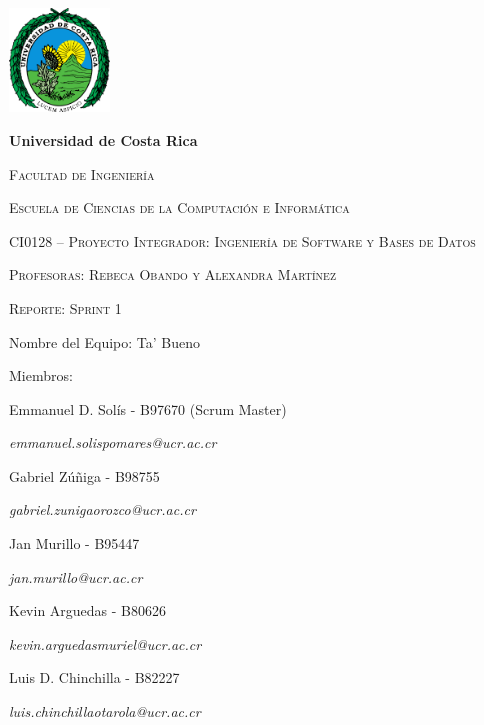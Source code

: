 \documentclass{article}
\begin{document}
\begin{titlepage}
\centering
{\includegraphics[width=0.2\textwidth]{logoUCR.png}\par}
\vspace{1cm}
{\bfseries\LARGE Universidad de Costa Rica \par}
\vspace{1cm}
{\scshape\Large Facultad de Ingenier\'ia \par}
{\scshape\Large Escuela de Ciencias de la Computaci\'on e Inform\'atica \par}
\vspace{1cm}
{\scshape\Large CI0128 – Proyecto Integrador: Ingeniería de Software y Bases de Datos \par}
{\scshape\Large Profesoras: Rebeca Obando y Alexandra Martínez \par}
\vspace{1cm}
{\scshape\Huge Reporte: Sprint 1 \par}
\vspace{1cm}
{\Large Nombre del Equipo: Ta' Bueno \par}
\vspace{0.5cm}
{\Large Miembros: \par}
{\Large Emmanuel D. Sol\'is - B97670 (Scrum Master)\par}
{\Large \textit{\color{blue}emmanuel.solispomares@ucr.ac.cr} \par}
{\Large Gabriel Zúñiga - B98755\par}
{\Large \textit{\color{blue}gabriel.zunigaorozco@ucr.ac.cr} \par}
{\Large Jan Murillo - B95447\par}
{\Large \textit{\color{blue}jan.murillo@ucr.ac.cr} \par}
{\Large Kevin Arguedas - B80626\par}
{\Large \textit{\color{blue}kevin.arguedasmuriel@ucr.ac.cr} \par}
{\Large Luis D. Chinchilla - B82227\par}
{\Large \textit{\color{blue}luis.chinchillaotarola@ucr.ac.cr} \par}
\end{titlepage}

\newpage
\tableofcontents
\end{document}
